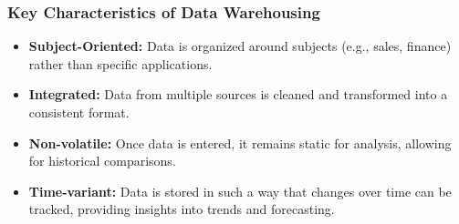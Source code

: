\documentclass[aspectratio=169]{beamer}
\begin{document}
\begin{frame}[fragile]
    \frametitle{Key Characteristics of Data Warehousing}
    \begin{itemize}
        \item \textbf{Subject-Oriented:} Data is organized around subjects (e.g., sales, finance) rather than specific applications.
        \item \textbf{Integrated:} Data from multiple sources is cleaned and transformed into a consistent format.
        \item \textbf{Non-volatile:} Once data is entered, it remains static for analysis, allowing for historical comparisons.
        \item \textbf{Time-variant:} Data is stored in such a way that changes over time can be tracked, providing insights into trends and forecasting.
    \end{itemize}
\end{frame}
\end{document}
